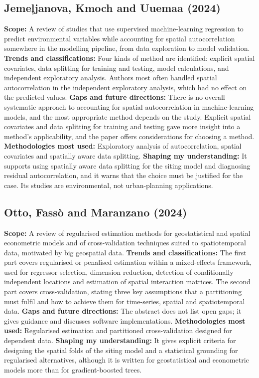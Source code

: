 \documentclass[journal]{IEEEtran}
\begin{document}
\subsection{Jeme\c{l}janova, Kmoch and Uuemaa (2024) \cite{jemeljanova2024}}
\textbf{Scope:} A review of studies that use supervised machine-learning regression to predict environmental variables while accounting for spatial autocorrelation somewhere in the modelling pipeline, from data exploration to model validation.
\textbf{Trends and classifications:} Four kinds of method are identified: explicit spatial covariates, data splitting for training and testing, model calculations, and independent exploratory analysis. Authors most often handled spatial autocorrelation in the independent exploratory analysis, which had no effect on the predicted values.
\textbf{Gaps and future directions:} There is no overall systematic approach to accounting for spatial autocorrelation in machine-learning models, and the most appropriate method depends on the study. Explicit spatial covariates and data splitting for training and testing gave more insight into a method's applicability, and the paper offers considerations for choosing a method.
\textbf{Methodologies most used:} Exploratory analysis of autocorrelation, spatial covariates and spatially aware data splitting.
\textbf{Shaping my understanding:} It supports using spatially aware data splitting for the siting model and diagnosing residual autocorrelation, and it warns that the choice must be justified for the case. Its studies are environmental, not urban-planning applications.

\subsection{Otto, Fass\`{o} and Maranzano (2024) \cite{otto2024}}
\textbf{Scope:} A review of regularised estimation methods for geostatistical and spatial econometric models and of cross-validation techniques suited to spatiotemporal data, motivated by big geospatial data.
\textbf{Trends and classifications:} The first part covers regularised or penalised estimation within a mixed-effects framework, used for regressor selection, dimension reduction, detection of conditionally independent locations and estimation of spatial interaction matrices. The second part covers cross-validation, stating three key assumptions that a partitioning must fulfil and how to achieve them for time-series, spatial and spatiotemporal data.
\textbf{Gaps and future directions:} The abstract does not list open gaps; it gives guidance and discusses software implementations.
\textbf{Methodologies most used:} Regularised estimation and partitioned cross-validation designed for dependent data.
\textbf{Shaping my understanding:} It gives explicit criteria for designing the spatial folds of the siting model and a statistical grounding for regularised alternatives, although it is written for geostatistical and econometric models more than for gradient-boosted trees.
\end{document}
